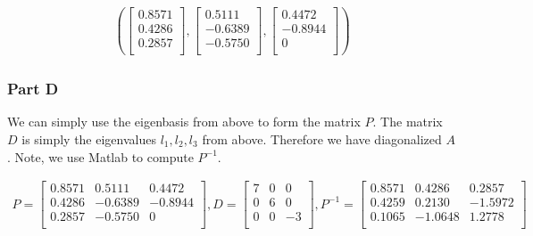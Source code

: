\begin{eqnarray}
  \left(
    \begin{bmatrix}
    0.8571 \\
    0.4286 \\
    0.2857 \\
    \end{bmatrix}
    ,
    \begin{bmatrix}
      0.5111 \\
      -0.6389 \\
      -0.5750 \\
    \end{bmatrix}
    ,
    \begin{bmatrix}
      0.4472 \\
      -0.8944 \\
      0 \\
    \end{bmatrix}
    \right)
\end{eqnarray}

\newpage
\subsubsection{Part D}

We can simply use the eigenbasis from above to form the matrix \(P\).
The matrix \(D\) is simply the eigenvalues \(l_1,l_2,l_3\) from above.
Therefore we have diagonalized \(A\).
Note, we use Matlab to compute \(P^{-1}\).

\begin{eqnarray}
  P = 
  \begin{bmatrix}
    0.8571 & 0.5111 & 0.4472 \\
    0.4286 & -0.6389 & -0.8944 \\
    0.2857 & -0.5750 & 0 \\
  \end{bmatrix}
  ,
  D = 
  \begin{bmatrix}
  7 & 0 & 0 \\
  0 & 6 & 0 \\
  0 & 0 & -3 \\
  \end{bmatrix}
  ,
  P^{-1} = 
  \begin{bmatrix}
    0.8571 &  0.4286 &  0.2857 \\
    0.4259 &  0.2130 & -1.5972 \\
    0.1065 & -1.0648 &  1.2778 \\   
  \end{bmatrix}
\end{eqnarray}




